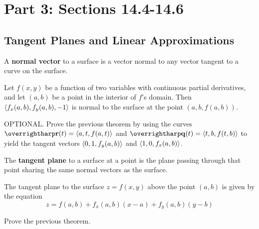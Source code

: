 \documentclass[letterpaper, twoside, 12pt]{book}
\begin{document}
\setcounter{chapter}{1}

\chapter{Part 3: Sections 14.4-14.6}

\setcounter{chapter}{14}
\setcounter{section}{3}

\section{Tangent Planes and Linear Approximations} %

\begin{definition}
  A \textbf{normal vector} to a surface is a vector normal to
  any vector tangent to a curve on the surface.
\end{definition}

\begin{theorem}
  Let $f(x,y)$ be a function of two variables with continuous partial
  derivatives, and let $(a,b)$ be a point in the interior of $f$'s
  domain. Then $\langle f_x(a,b),f_y(a,b),-1\rangle$ is normal to the surface
  at the point $(a,b,f(a,b))$.
\end{theorem}

          \begin{problem}
            OPTIONAL. Prove the previous theorem by using the curves
            $\vect{r}(t)=\<a,t,f(a,t)\>$ and
            $\vect{q}(t)=\<t,b,f(t,b)\>$ to yield the tangent vectors
            $\langle0,1,f_y(a,b)\rangle$ and $\langle1,0,f_x(a,b)\rangle$.
          \end{problem}

          \begin{solution}

          \end{solution}

\begin{definition}
  The \textbf{tangent plane} to a surface at a point is the plane passing
  through that point sharing the same normal vectors as the surface.
\end{definition}

\begin{theorem}
  The tangent plane to the surface $z=f(x,y)$ above the point $(a,b)$
  is given by the equation
    \[
      z = f(a,b) + f_x(a,b)(x-a)+f_y(a,b)(y-b)
    \]
\end{theorem}

          \begin{problem}
            Prove the previous theorem.
          \end{problem}
\end{document}
